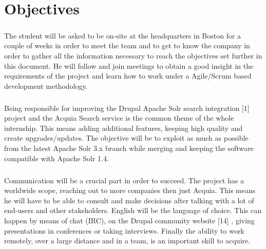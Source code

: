 \chapter{Objectives}
\paragraph{}
The student will be asked to be on-site at the headquarters in Boston for a couple of weeks in order to meet the team and to get to know the company in order to gather all the information necessary to reach the objectives set further in this document. He will follow and join meetings to obtain a good insight in the requirements of the project and learn how to work under a Agile/Scrum based development methodology.
\paragraph{}
Being responsible for improving the Drupal Apache Solr search integration [1] project and the Acquia Search service is the common theme of the whole internship. This means adding additional features, keeping high quality and create upgrades/updates. The objective will be to exploit as much as possible from the latest Apache Solr 3.x branch while merging and keeping the software compatible with Apache Solr 1.4.

\paragraph{}
Communication will be a crucial part in order to succeed. The project has a worldwide scope, reaching out to more companies then just Acquia. This means he will have to be able to consult and make decisions after talking with a lot of end-users and other stakeholders. English will be the language of choice. This can happen by means of chat (IRC), on the Drupal community website [14] , giving presentations in conferences or taking interviews.
Finally the ability to work remotely, over a large distance and in a team, is an important skill to acquire.

